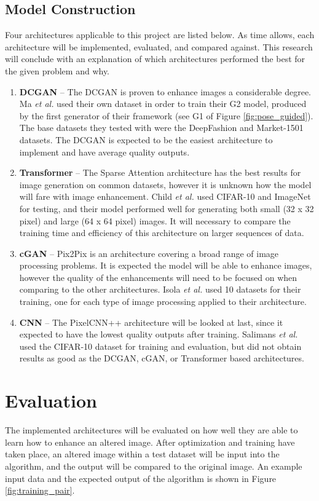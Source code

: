 \documentclass[letterpaper]{article} %
\begin{document}
\subsection{Model Construction}
\label{subsec:model}
Four architectures applicable to this project are listed below.
As time allows, each architecture will be implemented, evaluated, and compared
against. This research will conclude with an explanation of which architectures performed the best
for the given problem and why.
\begin{enumerate}
\item \textbf{DCGAN} --
The DCGAN is proven to enhance images a considerable degree.
Ma \textit{et al.} used their own dataset in order to train their G2 model,
produced by the first generator of their framework (see G1 of Figure \ref{fig:pose_guided}).
The base datasets they tested with were the DeepFashion and Market-1501 datasets.
The DCGAN is expected to be the easiest architecture to implement and have average quality outputs.
\item \textbf{Transformer} --
The Sparse Attention architecture has the best results for image generation
on common datasets, however it is unknown how the model will fare with
image enhancement.
Child \textit{et al.} used CIFAR-10 and ImageNet for testing,
and their model performed well for generating both small (32 x 32 pixel) and large (64 x 64 pixel)
images.
It will necessary to compare the training time and efficiency of this architecture on larger sequences
of data.
\item \textbf{cGAN} --
Pix2Pix is an architecture covering a broad range of image processing problems.
It is expected the model will be able to enhance images, however
the quality of the enhancements will need to be focused on when comparing to
the other architectures.
Isola \textit{et al.} used 10 datasets for their training,
one for each type of image processing applied to their architecture.
\item \textbf{CNN} --
The PixelCNN++ architecture will be looked at last, since it expected to have the lowest
quality outputs after training.
Salimans \textit{et al.} used the CIFAR-10 dataset for training and
evaluation, but did not obtain results as good as the
DCGAN, cGAN, or Transformer based architectures.
\end{enumerate}

\section{Evaluation}
\label{sec:methods/evaluation}
The implemented architectures will be evaluated on how well they are able to learn how to
enhance an altered image. After optimization and training have taken place,
an altered image within a test dataset will be input into the algorithm, and the output
will be compared to the original image. An example input data and the expected output
of the algorithm is shown in Figure \ref{fig:training_pair}.
\end{document}
